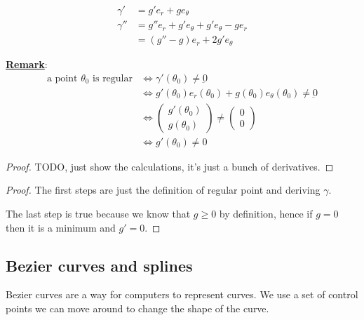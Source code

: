 \documentclass[10pt]{extarticle}
\renewcommand{\vec}[1]{\underbar{\ensuremath{#1}}}
\begin{document}
\begin{align*}
    \gamma'  & = g' e_r + g e_\theta                         \\
    \gamma'' & = g'' e_r + g' e_\theta + g' e_\theta - g e_r \\
             & = (g'' - g) e_r + 2 g' e_\theta
\end{align*}


\textbf{\underline{Remark}}:
\begin{align*}
    \text{a point $\theta_0$ is regular} & \iff \gamma'(\theta_0) \ne \vec{0}                                           \\
                                         & \iff g'(\theta_0) e_r(\theta_0) + g(\theta_0) e_\theta(\theta_0) \ne \vec{0} \\
                                         & \iff \begin{pmatrix}
                                                    g'(\theta_0) \\ g(\theta_0)
                                                \end{pmatrix} \ne \begin{pmatrix}
                                                                      0 \\ 0
                                                                  \end{pmatrix}                                              \\
                                         & \iff g'(\theta_0) \ne 0
\end{align*}

\begin{proof}
    TODO, just show the calculations, it's just a bunch of derivatives.
\end{proof}

\begin{proof}
    The first steps are just the definition of regular point and deriving $\gamma$.

    The last step is true because we know that $g \geq 0$ by definition, hence if $g = 0$ then it is a minimum and $g' = 0$.
\end{proof}

\subsection{Bezier curves and splines}

Bezier curves are a way for computers to represent curves.
We use a set of control points we can move around to change the shape of the curve.
\end{document}
